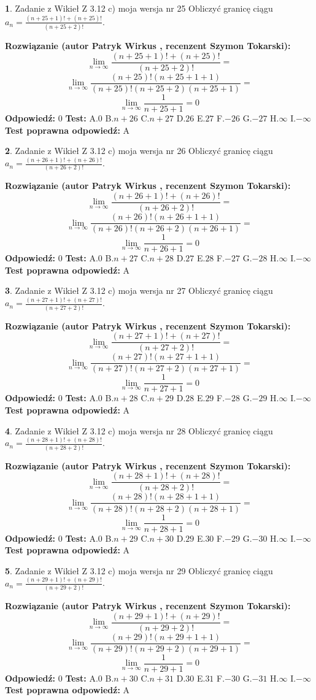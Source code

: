\documentclass[12pt, a4paper]{article}
\theoremstyle{definition} %
\newtheorem{zad}{}
\newcommand{\zadStart}[1]{\begin{zad}#1\newline}
\newcommand{\zadStop}{\end{zad}}
\newcommand{\rozwStart}[2]{\noindent \textbf{Rozwiązanie (autor #1 , recenzent #2): }\newline}
\newcommand{\rozwStop}{\newline}
\newcommand{\odpStart}{\noindent \textbf{Odpowiedź:}\newline}
\newcommand{\odpStop}{\newline}
\newcommand{\testStart}{\noindent \textbf{Test:}\newline}
\newcommand{\testStop}{\newline}
\newcommand{\kluczStart}{\noindent \textbf{Test poprawna odpowiedź:}\newline}
\newcommand{\kluczStop}{\newline}
\begin{document}
\zadStart{Zadanie z Wikieł Z 3.12 c) moja wersja nr 25}
Obliczyć granicę ciągu $a_{n}=\frac{(n+25+1)!+(n+25)!}{(n+25+2)!}$.
\zadStop
\rozwStart{Patryk Wirkus}{Szymon Tokarski}
$$\lim\limits_{n\to\infty}\frac{(n+25+1)!+(n+25)!}{(n+25+2)!}=$$
$$\lim\limits_{n\to\infty}\frac{(n+25)!(n+25+1+1)}{(n+25)!(n+25+2)(n+25+1)}=$$
$$\lim\limits_{n\to\infty}\frac{1}{n+25+1}= 0$$
\rozwStop
\odpStart
$0$
\odpStop
\testStart
A.$0$
B.$n+26$
C.$n+27$
D.$26$
E.$27$
F.$-26$
G.$-27$
H.$\infty$
I.$-\infty$
\testStop
\kluczStart
A
\kluczStop



\zadStart{Zadanie z Wikieł Z 3.12 c) moja wersja nr 26}
Obliczyć granicę ciągu $a_{n}=\frac{(n+26+1)!+(n+26)!}{(n+26+2)!}$.
\zadStop
\rozwStart{Patryk Wirkus}{Szymon Tokarski}
$$\lim\limits_{n\to\infty}\frac{(n+26+1)!+(n+26)!}{(n+26+2)!}=$$
$$\lim\limits_{n\to\infty}\frac{(n+26)!(n+26+1+1)}{(n+26)!(n+26+2)(n+26+1)}=$$
$$\lim\limits_{n\to\infty}\frac{1}{n+26+1}= 0$$
\rozwStop
\odpStart
$0$
\odpStop
\testStart
A.$0$
B.$n+27$
C.$n+28$
D.$27$
E.$28$
F.$-27$
G.$-28$
H.$\infty$
I.$-\infty$
\testStop
\kluczStart
A
\kluczStop



\zadStart{Zadanie z Wikieł Z 3.12 c) moja wersja nr 27}
Obliczyć granicę ciągu $a_{n}=\frac{(n+27+1)!+(n+27)!}{(n+27+2)!}$.
\zadStop
\rozwStart{Patryk Wirkus}{Szymon Tokarski}
$$\lim\limits_{n\to\infty}\frac{(n+27+1)!+(n+27)!}{(n+27+2)!}=$$
$$\lim\limits_{n\to\infty}\frac{(n+27)!(n+27+1+1)}{(n+27)!(n+27+2)(n+27+1)}=$$
$$\lim\limits_{n\to\infty}\frac{1}{n+27+1}= 0$$
\rozwStop
\odpStart
$0$
\odpStop
\testStart
A.$0$
B.$n+28$
C.$n+29$
D.$28$
E.$29$
F.$-28$
G.$-29$
H.$\infty$
I.$-\infty$
\testStop
\kluczStart
A
\kluczStop



\zadStart{Zadanie z Wikieł Z 3.12 c) moja wersja nr 28}
Obliczyć granicę ciągu $a_{n}=\frac{(n+28+1)!+(n+28)!}{(n+28+2)!}$.
\zadStop
\rozwStart{Patryk Wirkus}{Szymon Tokarski}
$$\lim\limits_{n\to\infty}\frac{(n+28+1)!+(n+28)!}{(n+28+2)!}=$$
$$\lim\limits_{n\to\infty}\frac{(n+28)!(n+28+1+1)}{(n+28)!(n+28+2)(n+28+1)}=$$
$$\lim\limits_{n\to\infty}\frac{1}{n+28+1}= 0$$
\rozwStop
\odpStart
$0$
\odpStop
\testStart
A.$0$
B.$n+29$
C.$n+30$
D.$29$
E.$30$
F.$-29$
G.$-30$
H.$\infty$
I.$-\infty$
\testStop
\kluczStart
A
\kluczStop



\zadStart{Zadanie z Wikieł Z 3.12 c) moja wersja nr 29}
Obliczyć granicę ciągu $a_{n}=\frac{(n+29+1)!+(n+29)!}{(n+29+2)!}$.
\zadStop
\rozwStart{Patryk Wirkus}{Szymon Tokarski}
$$\lim\limits_{n\to\infty}\frac{(n+29+1)!+(n+29)!}{(n+29+2)!}=$$
$$\lim\limits_{n\to\infty}\frac{(n+29)!(n+29+1+1)}{(n+29)!(n+29+2)(n+29+1)}=$$
$$\lim\limits_{n\to\infty}\frac{1}{n+29+1}= 0$$
\rozwStop
\odpStart
$0$
\odpStop
\testStart
A.$0$
B.$n+30$
C.$n+31$
D.$30$
E.$31$
F.$-30$
G.$-31$
H.$\infty$
I.$-\infty$
\testStop
\kluczStart
A
\kluczStop
\end{document}

